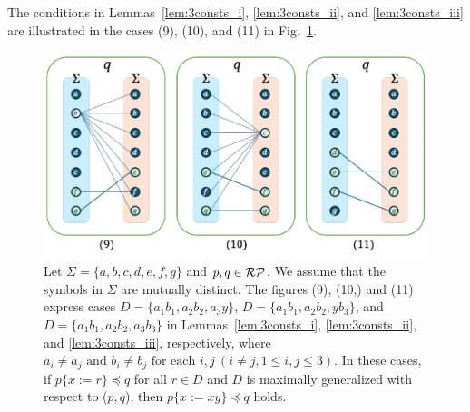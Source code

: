 The conditions in Lemmas~\ref{lem:3consts_i}, \ref{lem:3consts_ii}, and \ref{lem:3consts_iii} are illustrated in the cases (9), (10), and (11) in Fig.~\ref{fig:lem7bigraph}.

\begin{figure}[t]
  \begin{center}
    \includegraphics[scale=0.525]{figs/lem7bigraph.pdf}
    \caption{Let $\Sigma=\{a,b,c,d,e,f,g\}$ and $p,q \in \mathcal{RP}$. We assume that the symbols in $\Sigma$ are mutually distinct.
    The figures (9), (10,) and (11) express cases $D = \{ a_{1}b_{1}, a_{2}b_{2}, a_{3}y \}$, $D = \{a_{1}b_{1}, a_{2}b_{2}, yb_{3}\}$, and $D = \{ a_{1}b_{1}, a_{2}b_{2}, a_{3}b_{3} \}$ in Lemmas~\ref{lem:3consts_i}, \ref{lem:3consts_ii}, and \ref{lem:3consts_iii}, respectively, where $a_{i} \ne a_{j} \mbox{ and } b_{i} \ne b_{j} \mbox{ for each } i,j~(i\ne j, 1\le i,j\le 3)$.
    In these cases, if $p \{ x := r \} \preceq q$ for all $r \in D$ and $D$ is maximally generalized {\color{red}with respect to} ($p,q$), then $p \{ x := xy \} \preceq q$ holds.}\label{fig:lem7bigraph}
  \end{center}
\end{figure}


